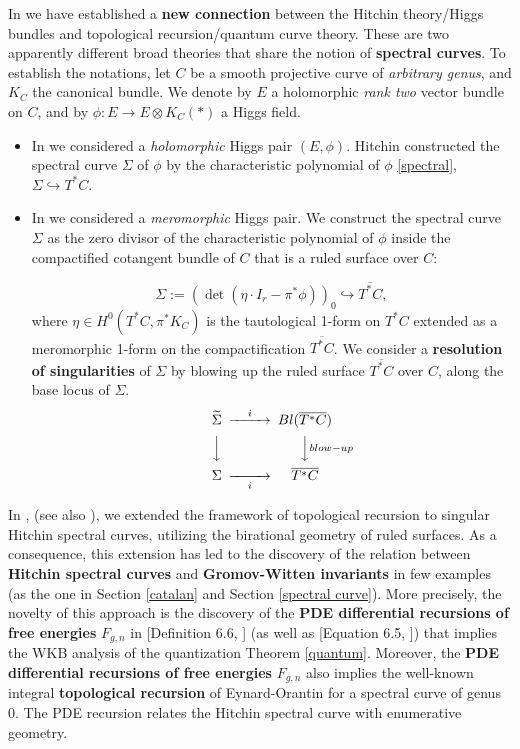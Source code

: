 \documentclass[oneside, 11pt]{amsart}
\theoremstyle{definition}
\numberwithin{equation}{subsection}
\begin{document}
In \cite{OD8} we have established a \textbf{new connection} between the Hitchin theory/Higgs bundles and topological recursion/quantum curve theory. These are two apparently different broad theories that share the notion of \textbf{spectral curves}. To establish the notations, let $C$ be a smooth projective curve of \textit{arbitrary genus}, and $K_C$ the canonical bundle. We denote by $E$  a holomorphic \textit{rank two} vector bundle on $C$, and by $\phi:E\stackrel{}{\rightarrow}E\otimes K_C(\ast)$ a Higgs field. 
\begin{itemize}
\item In \cite{OD8} we considered  a \textit{holomorphic} Higgs pair $(E, \phi)$. Hitchin constructed the spectral curve $\Sigma$ of $\phi$ by the characteristic polynomial of $\phi$ \eqref{spectral}, $\Sigma\hookrightarrow T^*C$.
\item In \cite{OD12} we considered   a \textit{meromorphic} Higgs pair. We construct the spectral curve  $\Sigma$ as the zero divisor of the characteristic polynomial of $\phi$ inside the compactified cotangent bundle of $C$ that is a ruled surface over $C$:   

$$\Sigma:= (\det(\eta \cdot I_r-\pi^*\phi))_{0}\hookrightarrow \overline{T^*C},$$
\noindent
where $\eta \in H^0(T^*C,\pi^*K_C)$ is the tautological 1-form on $T^*C$ extended as a meromorphic 1-form on the compactification $\overline{T^*C}$. We consider a \textbf{resolution of singularities} of $\Sigma$ by blowing up the ruled surface $\overline{T^*C}$ over $C$,  along the base locus of $\Sigma$.
$$
\begin{CD}
\widetilde{\Sigma}@>{i}>>Bl (\overline{T^*C}) 
\\
@V{}VV @VV{blow-up}V 
\\
\Sigma@>>{i}> \overline{T^*C} 
\end{CD}
$$
\end{itemize}

In \cite{OD8}, \cite{OD12} (see also \cite{OD17}), we extended the framework of topological recursion 
\cite{EO} to singular Hitchin spectral curves, utilizing the birational geometry of ruled surfaces. As a consequence, this extension has led to the discovery of the relation between \textbf{Hitchin spectral curves} and \textbf{Gromov-Witten invariants} in few examples (as the one in Section \ref{catalan} and Section \ref{spectral curve}). More precisely, the novelty of this approach is the discovery of the \textbf{PDE differential recursions of free energies} $F_{g,n}$ in [Definition 6.6, \cite{OD12}] (as well as [Equation 6.5, \cite{OD8}]) that implies the WKB analysis of the quantization Theorem \ref{quantum}. Moreover, the \textbf{PDE differential recursions of free energies} $F_{g,n}$ also implies the well-known integral \textbf{topological recursion} of Eynard-Orantin for a 
spectral curve of genus $0$. The PDE recursion relates the Hitchin spectral curve with enumerative geometry.
\end{document}

